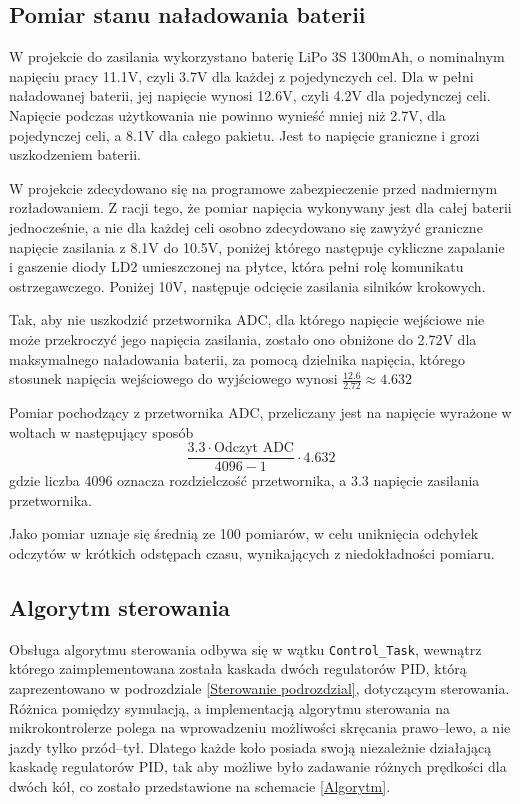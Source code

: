 \subsection{Pomiar stanu naładowania baterii}

W projekcie do zasilania wykorzystano baterię LiPo 3S 1300mAh, o nominalnym napięciu pracy 11.1V, czyli 3.7V dla każdej z pojedynczych cel. Dla w pełni naładowanej baterii, jej napięcie wynosi 12.6V, czyli 4.2V dla pojedynczej celi. Napięcie podczas użytkowania nie powinno wynieść mniej niż 2.7V, dla pojedynczej celi, a 8.1V dla całego pakietu. Jest to napięcie graniczne i grozi uszkodzeniem baterii.

W projekcie zdecydowano się na programowe zabezpieczenie przed nadmiernym rozładowaniem. Z racji tego, że pomiar napięcia wykonywany jest dla całej baterii jednocześnie, a nie dla każdej celi osobno zdecydowano się zawyżyć graniczne napięcie zasilania z 8.1V do 10.5V, poniżej którego następuje cykliczne zapalanie i gaszenie diody LD2 umieszczonej na płytce, która pełni rolę komunikatu ostrzegawczego. Poniżej 10V, następuje odcięcie zasilania silników krokowych.

Tak, aby nie uszkodzić przetwornika ADC, dla którego napięcie wejściowe nie może przekroczyć jego napięcia zasilania, zostało ono obniżone do 2.72V dla maksymalnego naładowania baterii, za pomocą dzielnika napięcia, którego stosunek napięcia wejściowego do wyjściowego wynosi $\frac{12.6}{2.72} \approx 4.632$

Pomiar pochodzący z przetwornika ADC, przeliczany jest na napięcie wyrażone w woltach w następujący sposób
$$
    \frac{3.3 \cdot \textrm{Odczyt ADC}}{4096 - 1} \cdot 4.632
$$
gdzie liczba 4096 oznacza rozdzielczość przetwornika, a 3.3 napięcie zasilania przetwornika.

Jako pomiar uznaje się średnią ze 100 pomiarów, w celu uniknięcia odchyłek odczytów w krótkich odstępach czasu, wynikających z niedokładności pomiaru.

\subsection{Algorytm sterowania}

Obsługa algorytmu sterowania odbywa się w wątku \texttt{Control\_Task}, wewnątrz którego zaimplementowana została kaskada dwóch regulatorów PID, którą zaprezentowano w podrozdziale \ref{Sterowanie podrozdzial}, dotyczącym sterowania. Różnica pomiędzy symulacją, a implementacją algorytmu sterowania na mikrokontrolerze polega na wprowadzeniu możliwości skręcania prawo--lewo, a nie jazdy tylko przód--tył. Dlatego każde koło posiada swoją niezależnie działającą kaskadę regulatorów PID, tak aby możliwe było zadawanie różnych prędkości dla dwóch kół, co zostało przedstawione na schemacie \ref{Algorytm}.

